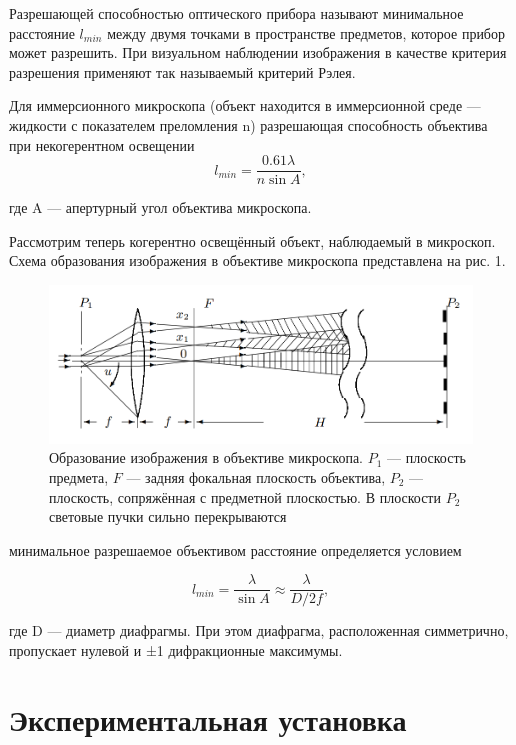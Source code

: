 \documentclass[a4paper]{article}
\begin{document}
Разрешающей способностью оптического прибора называют минимальное расстояние $l_{min}$ между двумя точками в пространстве предметов, которое прибор может разрешить. При визуальном наблюдении изображения в качестве критерия разрешения применяют так называемый критерий Рэлея. \par
Для иммерсионного микроскопа (объект находится в иммерсионной среде — жидкости с показателем преломления n) разрешающая способность объектива при некогерентном освещении
\begin{equation}
    l_{min} = \frac{0.61 \lambda}{n \sin A},
\end{equation}

где A — апертурный угол объектива микроскопа. \par
Рассмотрим теперь когерентно освещённый объект, наблюдаемый в микроскоп. Схема образования изображения в объективе микроскопа
представлена на рис. 1.
    \begin{figure}[h]
    \centering
    \includegraphics[width=15cm]{fig2.PNG}
    \caption{Образование изображения в объективе микроскопа. $P_1$ — плоскость предмета, $F$ — задняя фокальная плоскость объектива, $P_2$ — плоскость,
сопряжённая с предметной плоскостью. В плоскости $P_2$ световые пучки
сильно перекрываются}
    \label{fig:vac}
\end{figure}

минимальное разрешаемое объективом расстояние
определяется условием

\begin{equation}
    l_{min} = \frac{\lambda}{\sin A} \approx \frac{\lambda}{D/2f},
\end{equation}

где D — диаметр диафрагмы. При этом диафрагма, расположенная
симметрично, пропускает нулевой и ±1 дифракционные максимумы.


\section{Экспериментальная установка}
\end{document}

